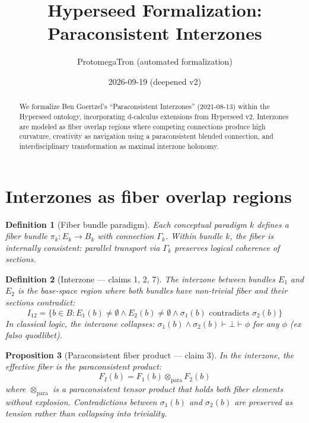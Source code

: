 \documentclass[11pt,a4paper]{article}
\title{Hyperseed Formalization:\\
  Paraconsistent Interzones}
\author{ProtomegaTron (automated formalization)}
\date{2026-09-19 (deepened v2)}
\newtheorem{definition}{Definition}[section]
\newtheorem{proposition}[definition]{Proposition}
\begin{document}
\maketitle

\begin{abstract}
We formalize Ben Goertzel's ``Paraconsistent Interzones''
(2021-08-13) within the Hyperseed ontology, incorporating d-calculus
extensions from Hyperseed v2. Interzones are modeled as fiber overlap
regions where competing connections produce high curvature, creativity
as navigation using a paraconsistent blended connection, and
interdisciplinary transformation as maximal interzone holonomy.
\end{abstract}

\tableofcontents

\section{Interzones as fiber overlap regions}

\begin{definition}[Fiber bundle paradigm]
Each conceptual paradigm $k$ defines a fiber bundle
$\pi_k: E_k \to B_k$ with connection $\Gamma_k$. Within bundle $k$,
the fiber is internally consistent: parallel transport via $\Gamma_k$
preserves logical coherence of sections.
\end{definition}

\begin{definition}[Interzone --- claims 1, 2, 7]
The \emph{interzone} between bundles $E_1$ and $E_2$ is the base-space
region where both bundles have non-trivial fiber and their sections
contradict:
\[
  I_{12} = \{b \in B : E_1(b) \neq \emptyset \wedge E_2(b) \neq \emptyset
    \wedge \sigma_1(b) \text{ contradicts } \sigma_2(b)\}
\]
In classical logic, the interzone collapses: $\sigma_1(b) \wedge \sigma_2(b)
\vdash \bot \vdash \phi$ for any $\phi$ (ex falso quodlibet).
\end{definition}

\begin{proposition}[Paraconsistent fiber product --- claim 3]
\label{prop:para}
In the interzone, the effective fiber is the \emph{paraconsistent product}:
\[
  F_I(b) = F_1(b) \otimes_{\text{para}} F_2(b)
\]
where $\otimes_{\text{para}}$ is a paraconsistent tensor product that
holds both fiber elements without explosion. Contradictions between
$\sigma_1(b)$ and $\sigma_2(b)$ are preserved as tension rather than
collapsing into triviality.
\end{proposition}
\end{document}
